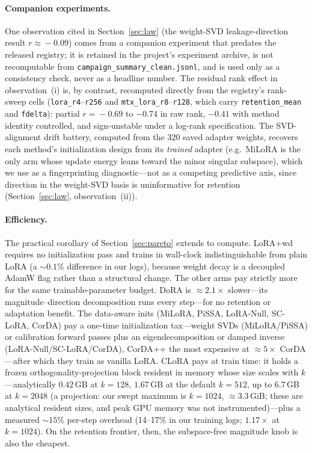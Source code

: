 \documentclass[11pt]{article}
\begin{document}
\paragraph{Companion experiments.} One observation cited in
Section~\ref{sec:law} (the weight-SVD leakage-direction
result $r\!\approx\!-0.09$) comes from a companion experiment that predates the
released registry; it is retained in the project's experiment archive, is not
recomputable from \texttt{campaign\_summary\_clean.jsonl}, and is used only as a
consistency check, never as a headline number. The residual rank effect in
observation~(i) is, by contrast, recomputed directly from the registry's
rank-sweep cells (\texttt{lora\_r4}--\texttt{r256} and
\texttt{mtx\_lora\_r8}--\texttt{r128}, which carry \texttt{retention\_mean} and
\texttt{fdelta}): partial $r\!=\!-0.69$ to $-0.74$ in raw rank, $-0.41$ with
method identity controlled, and sign-unstable under a log-rank specification.
The SVD-alignment drift battery, computed from the 320 saved adapter weights,
recovers each method's initialization design from its \emph{trained} adapter
(e.g.\ MiLoRA is the only arm whose update energy leans toward the minor singular
subspace), which we use as a fingerprinting diagnostic---not as a competing
predictive axis, since direction in the weight-SVD basis is uninformative for
retention (Section~\ref{sec:law}, observation~(ii)).

\paragraph{Efficiency.} The practical corollary of Section~\ref{sec:pareto} extends
to compute. LoRA{+}wd requires no initialization pass and trains in wall-clock
indistinguishable from plain LoRA (a $\sim\!0.1\%$ difference in our logs), because
weight decay is a decoupled AdamW flag rather than a structural change. The other
arms pay strictly more for the same trainable-parameter budget. DoRA is
$\approx\!2.1\times$ slower---its magnitude--direction decomposition runs every
step---for no retention or adaptation benefit. The data-aware inits (MiLoRA, PiSSA,
LoRA-Null, SC-LoRA, CorDA) pay a one-time initialization tax---weight SVDs
(MiLoRA/PiSSA) or calibration forward passes plus an eigendecomposition or damped
inverse (LoRA-Null/SC-LoRA/CorDA), CorDA++ the most expensive at
$\approx\!5\times$ CorDA---after which they train as vanilla LoRA. CLoRA pays at
train time: it holds a frozen orthogonality-projection block resident in memory whose
size scales with $k$---analytically $0.42$\,GB at $k{=}128$, $1.67$\,GB at the default
$k{=}512$, up to $6.7$\,GB at $k{=}2048$ (a projection: our swept maximum is
$k{=}1024$, $\approx\!3.3$\,GiB; these are analytical resident sizes, and peak GPU
memory was not instrumented)---plus a measured $\sim\!15\%$ per-step overhead
(14--17\% in our training logs; $1.17\times$ at $k{=}1024$). On the retention
frontier, then, the subspace-free magnitude knob is also the cheapest.
\end{document}
